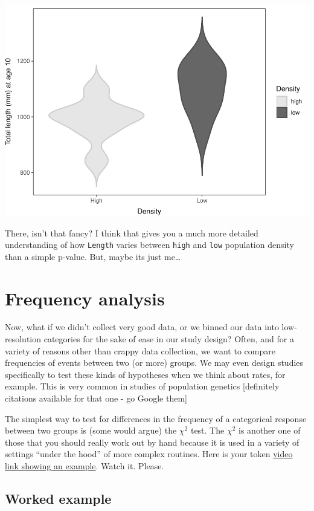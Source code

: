 \documentclass[
]{book}
\begin{document}
\includegraphics{worstr_files/figure-latex/unnamed-chunk-176-1.pdf}

There, isn't that fancy? I think that gives you a much more detailed understanding of how \texttt{Length} varies between \texttt{high} and \texttt{low} population density than a simple p-value. But, maybe its just me\ldots{}

\hypertarget{frequency-analysis}{%
\section{Frequency analysis}\label{frequency-analysis}}

Now, what if we didn't collect very good data, or we binned our data into low-resolution categories for the sake of ease in our study design? Often, and for a variety of reasons other than crappy data collection, we want to compare frequencies of events between two (or more) groups. We may even design studies specifically to test these kinds of hypotheses when we think about rates, for example. This is very common in studies of population genetics {[}definitely citations available for that one - go Google them{]}

The simplest way to test for differences in the frequency of a categorical response between two groups is (some would argue) the \(\chi^2\) test. The \(\chi^2\) is another one of those that you should really work out by hand because it is used in a variety of settings ``under the hood'' of more complex routines. Here is your token \href{https://www.youtube.com/watch?v=V4SRgabFbz0}{video link showing an example}. Watch it. Please.

\hypertarget{worked-example}{%
\subsection{Worked example}\label{worked-example}}
\end{document}

